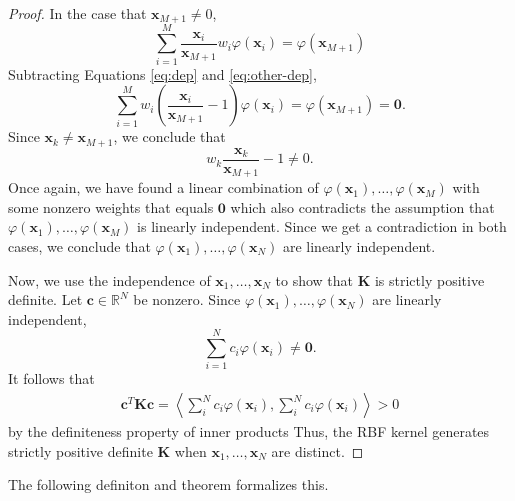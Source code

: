 \begin{proof}
    In the case that $\mathbf{x}_{M + 1} \neq 0$, 
    \begin{equation}\label{eq:other-dep}
        \sum\limits_{i=1}^{M} \frac{\mathbf{x}_i}{\mathbf{x}_{M + 1}} w_i \varphi(\mathbf{x}_i) = \varphi(\mathbf{x}_{M + 1})
    \end{equation}
    Subtracting Equations \ref{eq:dep} and \ref{eq:other-dep},
    \begin{equation*}
        \sum\limits_{i=1}^{M} w_i \left(\frac{\mathbf{x}_i}{\mathbf{x}_{M + 1}} - 1\right) \varphi(\mathbf{x}_i) = \varphi(\mathbf{x}_{M + 1}) = \mathbf{0}.
    \end{equation*}
    Since $\mathbf{x}_k \neq \mathbf{x}_{M + 1}$, we conclude that
    \begin{equation*}
        w_k\frac{ \mathbf{x}_k }{ \mathbf{x}_{M + 1} } - 1 \neq 0.
    \end{equation*}
    Once again, we have found a linear combination of $\varphi(\mathbf{x}_1), \ldots, \varphi(\mathbf{x}_M)$ with some nonzero weights that equals $\mathbf{0}$ which also contradicts the assumption that $\varphi(\mathbf{x}_1), \ldots, \varphi(\mathbf{x}_M)$ is linearly independent.
    Since we get a contradiction in both cases, we conclude that $\varphi(\mathbf{x}_1), \ldots, \varphi(\mathbf{x}_N)$ are linearly independent.

    Now, we use the independence of $\mathbf{x}_1, \ldots, \mathbf{x}_N$ to show that $\mathbf{K}$ is strictly positive definite.
    Let $\mathbf{c} \in \mathbb{R}^{N}$ be nonzero.
    Since $\varphi(\mathbf{x}_1), \ldots, \varphi(\mathbf{x}_N)$ are linearly independent,
    \begin{equation*}
        \sum\limits_{i = 1}^{N} c_i \varphi(\mathbf{x}_i) \neq \mathbf{0}.
    \end{equation*}
    It follows that
    \begin{align*}
        \mathbf{c}^{T} \mathbf{K} \mathbf{c}
        = \left\langle \sum\limits_{i}^{N} c_i \varphi(\mathbf{x}_i), \sum\limits_{i}^{N} c_i \varphi(\mathbf{x}_i) \right\rangle
        > 0
    \end{align*}
    by the definiteness property of inner products
    Thus, the RBF kernel generates strictly positive definite $\mathbf{K}$ when $\mathbf{x}_1, \ldots, \mathbf{x}_N$
    are distinct.
\end{proof}

The following definiton and theorem formalizes this.

